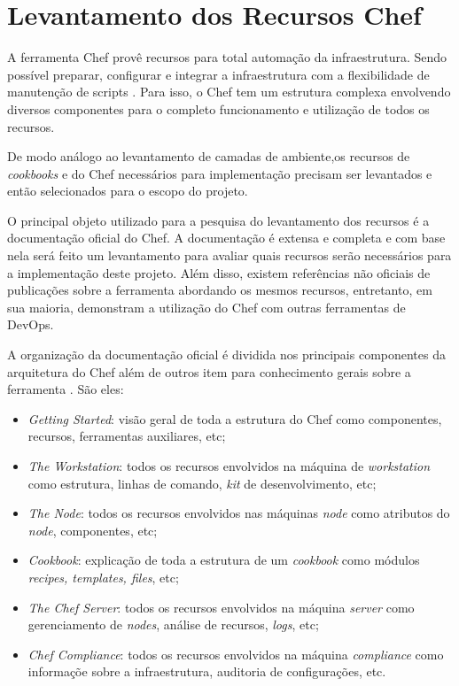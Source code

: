 \section{Levantamento dos Recursos Chef}
\label{sec:rec-chef}

A ferramenta Chef provê recursos para total automação da infraestrutura.
Sendo possível preparar, configurar e integrar a infraestrutura com a
flexibilidade de manutenção de scripts \cite{sharma:2015}. Para isso, o
Chef tem um estrutura complexa envolvendo diversos componentes para
o completo funcionamento e utilização de todos os recursos.

De modo análogo ao levantamento de camadas de ambiente,os recursos
de \textit{cookbooks} e do Chef necessários para implementação precisam
ser levantados e então selecionados para o escopo do projeto.

O principal objeto utilizado para a pesquisa do levantamento dos recursos
é a documentação oficial do Chef. A documentação é extensa e completa e
com base nela será feito um levantamento para avaliar quais recursos
serão necessários para a implementação deste projeto. Além disso, existem
referências não oficiais de publicações sobre a ferramenta abordando os
mesmos recursos, entretanto, em sua maioria, demonstram a utilização do
Chef com outras ferramentas de DevOps.

A organização da documentação oficial é dividida nos principais componentes
da arquitetura do Chef além de outros item para conhecimento gerais sobre a
ferramenta \cite{chefdoc:2016}. São eles:

\begin{itemize}
  \item \textit{Getting Started}: visão geral de toda a estrutura do Chef
    como componentes, recursos, ferramentas auxiliares, etc;
  \item \textit{The Workstation}: todos os recursos envolvidos na máquina de \textit{workstation}
    como estrutura, linhas de comando, \textit{kit} de desenvolvimento, etc;
  \item \textit{The Node}: todos os recursos envolvidos nas máquinas \textit{node}
    como atributos do \textit{node}, componentes, etc;
  \item \textit{Cookbook}: explicação de toda a estrutura de um \textit{cookbook}
    como módulos \textit{recipes, templates, files}, etc;
  \item \textit{The Chef Server}: todos os recursos envolvidos na máquina \textit{server}
    como gerenciamento de \textit{nodes}, análise de recursos, \textit{logs}, etc;
  \item \textit{Chef Compliance}: todos os recursos envolvidos na máquina \textit{compliance}
    como informaçõe sobre a infraestrutura, auditoria de configurações, etc.
\end{itemize}

